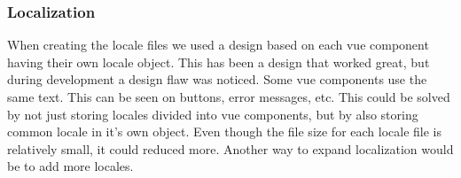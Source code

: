 \subsubsection{Localization}
When creating the locale files we used a design based on each vue component having their own locale object. This has been a design that worked great, but during development a design flaw was noticed. Some vue components use the same text. This can be seen on buttons, error messages, etc. This could be solved by not just storing locales divided into vue components, but by also storing common locale in it's own object. Even though the file size for each locale file is relatively small, it could reduced more. Another way to expand localization would be to add more locales.
